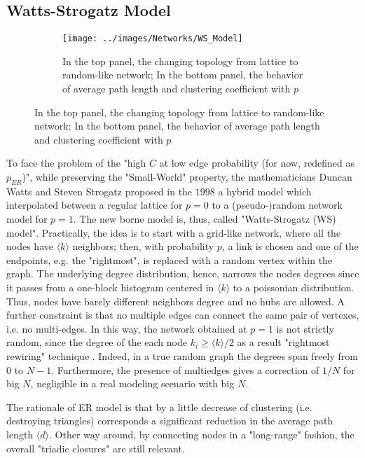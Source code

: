 \documentclass[a4paper,12pt,twoside]{book} %
\theoremstyle{definition}
\begin{document}
\subsection{Watts-Strogatz Model}
\label{sec:WS_Model}
\begin{figure}[ht]
    \begin{subfigure}{\textwidth}
        \texttt{[image: ../images/Networks/WS\_Model]}
        \centering
        \caption{In the top panel, the changing topology from lattice to random-like network; In the bottom panel, the behavior of average path length and clustering coefficient with $p$ \cite{Olaf:2011_NonRandomBrain}}
        \label{fig:WSmodel}
    \end{subfigure}
\end{figure}

To face the problem of the "high $C$ at low edge probability (for now, redefined as $p_{ER}$)", while preserving the "Small-World" property, the mathematicians Duncan Watts and Steven Strogatz proposed in the $1998$ a hybrid model which interpolated between a regular lattice for $p = 0$ to a (pseudo-)random network model for $p = 1$. The new borne model is, thus, called "Watts-Strogatz (WS) model".
Practically, the idea is to start with a grid-like network, where all the nodes have $\langle k \rangle$ neighbors; then, with probability $p$, a link is chosen and one of the endpoints, e.g. the "rightmost", is replaced with a random vertex within the graph. The underlying degree distribution, hence, narrows the nodes degrees since it passes from a one-block histogram centered in $\langle k \rangle$ to a poissonian distribution. Thus, nodes have barely different neighbors degree and no hubs are allowed.
A further constraint is that no multiple edges can connect the same pair of vertexes, i.e. no multi-edges. In this way, the network obtained at $p = 1$ is not strictly random, since the degree of the each node $k_i \geq  \langle k \rangle /2$ as a result "rightmost rewiring" technique \cite{Newman:2010_Net:AnIntro}. Indeed, in a true random graph the degrees span freely from $0$ to $N-1$. Furthermore, the presence of multiedges gives a correction of $1/N$ for big $N$, negligible in a real modeling scenario with big $N$.

The rationale of ER model is that by a little decrease of clustering (i.e. destroying triangles) corresponds a significant reduction in the average path length $\langle d \rangle$. Other way around, by connecting nodes in a "long-range" fashion, the overall "triadic closures" are still relevant. 
\end{document}
